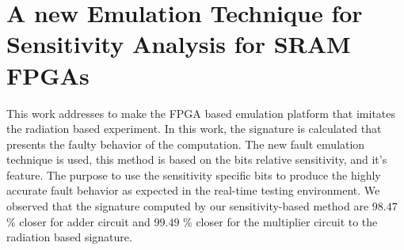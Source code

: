 

\section{A new Emulation Technique for Sensitivity Analysis
for SRAM FPGAs}
\label{intro}


This work addresses to make the FPGA based emulation platform that imitates the radiation based experiment. In this work, the signature is calculated that presents the faulty behavior of the computation. The new fault emulation technique is used, this method is based on the bits relative sensitivity, and it's feature. The purpose to use the sensitivity specific bits to produce the highly accurate fault behavior as expected in the real-time testing environment.  We observed that the signature computed by our sensitivity-based method are $98.47$\% closer for adder circuit and $99.49$ \% closer for the multiplier circuit to the radiation based signature.

